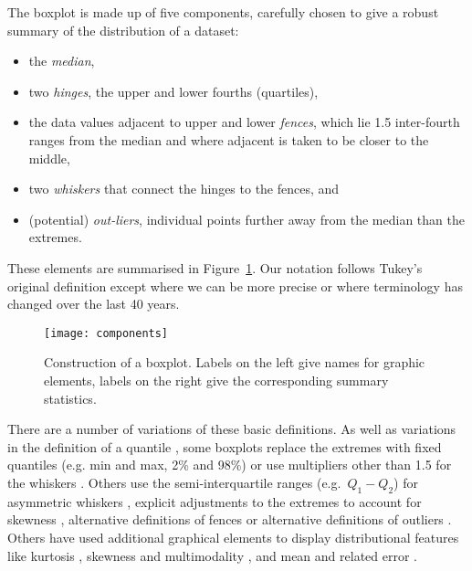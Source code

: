 \documentclass[oneside]{article}
\begin{document}
The boxplot is made up of five components, carefully chosen to give a robust summary of the distribution of a dataset:

\begin{itemize}

\item the \emph{median},

\item two \emph{hinges}, the upper and lower fourths (quartiles),

\item the data values adjacent to upper and lower \emph{fences}, which lie 1.5 inter-fourth ranges from the median and where adjacent is taken to be closer to the middle,

\item two \emph{whiskers} that connect the hinges to the fences, and

\item (potential) \emph{out-liers}, individual points further away from the median than the extremes.

\end{itemize}

\noindent These elements are summarised in Figure~\ref{fig:construction}. Our notation follows Tukey's original definition except where we can be more precise or where terminology has changed over the last 40 years. 

\begin{figure}[htbp]
  \centering
  \texttt{[image: components]}
  \caption{Construction of a boxplot.  Labels on the left give names for graphic elements, labels on the right give the corresponding summary statistics.}
  \label{fig:construction}
\end{figure}

There are a number of variations of these basic definitions. As well as variations in the definition of a quantile \citep{hyndman:1996}, some boxplots replace the extremes with fixed quantiles (e.g. min and max, 2\% and 98\%) or use multipliers other than 1.5 for the whiskers \citep{frigge:1989}. Others use the semi-interquartile ranges (e.g.\ $Q_1 - Q_2$) for asymmetric whiskers \citep{Rousseeuw1999}, explicit adjustments to the extremes to account for skewness \citep{hubert:2008}, alternative definitions of fences \citep{dumbgen:2007} or alternative definitions of outliers \citep{schwertman:2004,carter:2009}. Others have used additional graphical elements to display distributional features like kurtosis \citep{aslam:1991}, skewness and multimodality \citep{choonpradub:2005}, and mean and related error \citep{marmolejo-ramos:2010}.
\end{document}
